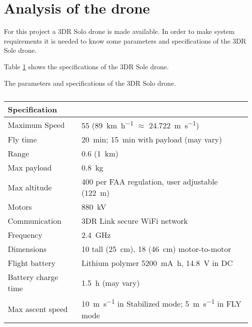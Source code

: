 \section{Analysis of the drone} \label{sec:droneSpec}
For this project a 3DR Solo drone is made available. In order to make system requirements it is needed to know some parameters and specifications of the 3DR Sole drone. 

Table \ref{tab:DroneSpecs} shows the specifications of the 3DR Sole drone. 
\begin{table}[h]
	\centering
	\caption{The parameters and specifications of the 3DR Solo drone.} \label{tab:DroneSpecs}

	\begin{tabularx}{\textwidth}{lX}
		Specification 		&  								\\ \toprule \rowcolor{lightGrey}
		Maximum Speed		&  \SI{55}{\mph} (\SI{89}{\kilo\meter\per\hour} $\approx$ \SI{24.722}{\m\per\second})								\\
		Fly time 			& \SI{20}{\minute}; \SI{15}{\minute} with payload (may vary)	\\ \rowcolor{lightGrey}
		Range 		 		& \SI{0.6}{\miles} (\SI{1}{\kilo\meter})									\\
		Max payload			& \SI{0.8}{\kilogram} 											\\ \rowcolor{lightGrey}
		Max altitude		& \SI{400}{\feet} per FAA regulation, user adjustable (\SI{122}{\meter})\\
		Motors				& \SI{880}{\kilo\volt} 											\\ \rowcolor{lightGrey}
		Communication		& 3DR Link secure WiFi network 						\\
		Frequency			& \SI{2.4}{\giga\hertz} 											\\ \rowcolor{lightGrey}
		Dimensions			& \SI{10}{\inch} tall (\SI{25}{\centi\meter}), \SI{18}{\inch} (\SI{46}{\centi\meter}) motor-to-motor\\
		Flight battery		& Lithium polymer \SI{5200}{\milli\ampere\hour}, \SI{14.8}{\volt} in DC 				\\ \rowcolor{lightGrey}
		Battery charge time	& \SI{1.5}{\hour} (may vary)								\\
		Max ascent speed	& \SI{10}{\meter\per\second} in Stabilized mode; \SI{5}{\meter\per\second} in FLY mode		\\ 
	\end{tabularx}
	\caption*{\citep{Web:DroneSpec}}
\end{table}



